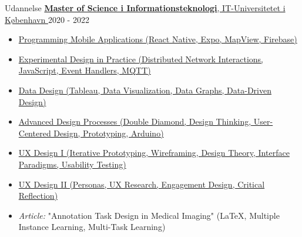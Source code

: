 \documentclass{resume}
\begin{document}
\begin{rSection}{Udannelse}
    \href{https://itu.dk}{
        \textbf{Master of Science i Informationsteknologi}, IT-Universitetet i København
    }
    \hfill
    2020 - 2022
    \begin{itemize}
        \item \href{https://learnit.itu.dk/local/coursebase/view.php?ciid=666}{Programming Mobile Applications (React Native, Expo, MapView, Firebase)}
        \item \href{https://learnit.itu.dk/local/coursebase/view.php?ciid=589}{Experimental Design in Practice (Distributed Network Interactions, JavaScript, Event Handlers, MQTT)}
        \item \href{https://learnit.itu.dk/local/coursebase/view.php?ciid=578}{Data Design (Tableau, Data Visualization, Data Graphs, Data-Driven Design)}
        \item \href{https://learnit.itu.dk/local/coursebase/view.php?ciid=487}{Advanced Design Processes (Double Diamond, Design Thinking, User-Centered Design, Prototyping, Arduino)}
        \item \href{https://learnit.itu.dk/local/coursebase/view.php?ciid=624}{UX Design I (Iterative Prototyping, Wireframing, Design Theory, Interface Paradigms, Usability Testing)}
        \item \href{https://learnit.itu.dk/local/coursebase/view.php?ciid=681}{UX Design II (Personas, UX Research, Engagement Design, Critical Reflection)}
        \item \textit{Article:} "Annotation Task Design in Medical Imaging" (LaTeX, Multiple Instance Learning, Multi-Task Learning)
    \end{itemize}


\end{rSection}
\end{document}
